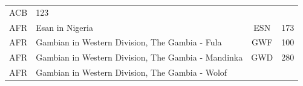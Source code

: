 \documentclass[]{book}
\begin{document}
\begin{longtable}[]{@{}clcc@{}}
\begin{minipage}[t]{0.09\columnwidth}
ACB\strut
\end{minipage} & \begin{minipage}[t]{0.07\columnwidth}\centering\strut
123\strut
\end{minipage}\tabularnewline
\begin{minipage}[t]{0.14\columnwidth}\centering\strut
AFR\strut
\end{minipage} & \begin{minipage}[t]{0.59\columnwidth}\raggedright\strut
Esan in Nigeria\strut
\end{minipage} & \begin{minipage}[t]{0.09\columnwidth}\centering\strut
ESN\strut
\end{minipage} & \begin{minipage}[t]{0.07\columnwidth}\centering\strut
173\strut
\end{minipage}\tabularnewline
\begin{minipage}[t]{0.14\columnwidth}\centering\strut
AFR\strut
\end{minipage} & \begin{minipage}[t]{0.59\columnwidth}\raggedright\strut
Gambian in Western Division, The Gambia - Fula\strut
\end{minipage} & \begin{minipage}[t]{0.09\columnwidth}\centering\strut
GWF\strut
\end{minipage} & \begin{minipage}[t]{0.07\columnwidth}\centering\strut
100\strut
\end{minipage}\tabularnewline
\begin{minipage}[t]{0.14\columnwidth}\centering\strut
AFR\strut
\end{minipage} & \begin{minipage}[t]{0.59\columnwidth}\raggedright\strut
Gambian in Western Division, The Gambia - Mandinka\strut
\end{minipage} & \begin{minipage}[t]{0.09\columnwidth}\centering\strut
GWD\strut
\end{minipage} & \begin{minipage}[t]{0.07\columnwidth}\centering\strut
280\strut
\end{minipage}\tabularnewline
\begin{minipage}[t]{0.14\columnwidth}\centering\strut
AFR\strut
\end{minipage} & \begin{minipage}[t]{0.59\columnwidth}\raggedright\strut
Gambian in Western Division, The Gambia - Wolof\strut

\end{minipage}
\end{longtable}
\end{document}
